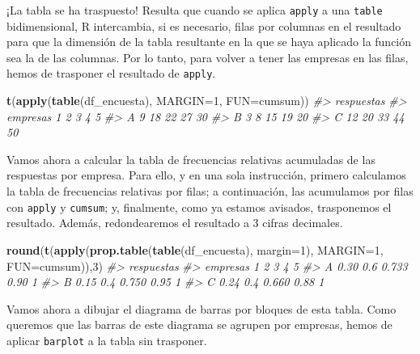 \documentclass[
]{book}
\newenvironment{Shaded}{\begin{snugshade}}{\end{snugshade}}
\newcommand{\CommentTok}[1]{\textcolor[rgb]{0.56,0.35,0.01}{\textit{#1}}}
\newcommand{\DataTypeTok}[1]{\textcolor[rgb]{0.13,0.29,0.53}{#1}}
\newcommand{\DecValTok}[1]{\textcolor[rgb]{0.00,0.00,0.81}{#1}}
\newcommand{\KeywordTok}[1]{\textcolor[rgb]{0.13,0.29,0.53}{\textbf{#1}}}
\newcommand{\NormalTok}[1]{#1}
\theoremstyle{definition}
\theoremstyle{definition}
\theoremstyle{definition}
\theoremstyle{remark}
\begin{document}
¡La tabla se ha traspuesto!
Resulta que cuando se aplica \texttt{apply} a una \texttt{table} bidimensional, R intercambia, si es necesario, filas por columnas en el resultado para que la dimensión de la tabla resultante en la que se haya aplicado la función sea la de las columnas. Por lo tanto, para volver a tener las empresas en las filas, hemos de trasponer el resultado de \texttt{apply}.

\begin{Shaded}
\begin{Highlighting}[]
\KeywordTok{t}\NormalTok{(}\KeywordTok{apply}\NormalTok{(}\KeywordTok{table}\NormalTok{(df\_encuesta), }\DataTypeTok{MARGIN=}\DecValTok{1}\NormalTok{, }\DataTypeTok{FUN=}\NormalTok{cumsum))}
\CommentTok{\#\textgreater{}         respuestas}
\CommentTok{\#\textgreater{} empresas  1  2  3  4  5}
\CommentTok{\#\textgreater{}        A  9 18 22 27 30}
\CommentTok{\#\textgreater{}        B  3  8 15 19 20}
\CommentTok{\#\textgreater{}        C 12 20 33 44 50}
\end{Highlighting}
\end{Shaded}

Vamos ahora a calcular la tabla de frecuencias relativas acumuladas de las respuestas por empresa. Para ello, y en una sola instrucción, primero calculamos la tabla de frecuencias relativas por filas; a continuación, las acumulamos por filas con \texttt{apply} y \texttt{cumsum}; y, finalmente, como ya estamos avisados, trasponemos el resultado. Además, redondearemos el resultado a 3 cifras decimales.

\begin{Shaded}
\begin{Highlighting}[]
\KeywordTok{round}\NormalTok{(}\KeywordTok{t}\NormalTok{(}\KeywordTok{apply}\NormalTok{(}\KeywordTok{prop.table}\NormalTok{(}\KeywordTok{table}\NormalTok{(df\_encuesta), }\DataTypeTok{margin=}\DecValTok{1}\NormalTok{), }\DataTypeTok{MARGIN=}\DecValTok{1}\NormalTok{, }\DataTypeTok{FUN=}\NormalTok{cumsum)),}\DecValTok{3}\NormalTok{)}
\CommentTok{\#\textgreater{}         respuestas}
\CommentTok{\#\textgreater{} empresas    1   2     3    4 5}
\CommentTok{\#\textgreater{}        A 0.30 0.6 0.733 0.90 1}
\CommentTok{\#\textgreater{}        B 0.15 0.4 0.750 0.95 1}
\CommentTok{\#\textgreater{}        C 0.24 0.4 0.660 0.88 1}
\end{Highlighting}
\end{Shaded}

Vamos ahora a dibujar el diagrama de barras por bloques de esta tabla. Como queremos que las barras de este diagrama se agrupen por empresas, hemos de aplicar \texttt{barplot} a la tabla sin trasponer.
\end{document}
